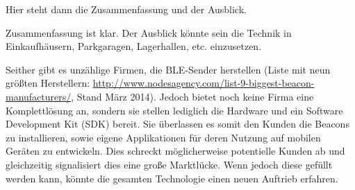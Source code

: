 Hier steht dann die Zusammenfassung und der Ausblick.


Zusammenfassung ist klar. Der Ausblick könnte sein die Technik in Einkaufhäusern, Parkgaragen, Lagerhallen, etc. einzusetzen. 

Seither gibt es unzählige Firmen, die BLE-Sender herstellen (Liste mit neun größten Herstellern: \url{http://www.nodesagency.com/list-9-biggest-beacon-manufacturers/}, Stand März 2014). Jedoch bietet noch keine Firma eine Komplettlösung an, sondern sie stellen lediglich die Hardware und ein Software Development Kit (SDK) bereit. Sie überlassen es somit den Kunden die Beacons zu installieren, sowie eigene Applikationen für deren Nutzung auf mobilen Geräten zu entwickeln. Dies schreckt möglicherweise potentielle Kunden ab und gleichzeitig signalisiert dies eine große Marktlücke. Wenn jedoch diese gefüllt werden kann, könnte die gesamten Technologie einen neuen Auftrieb erfahren.

